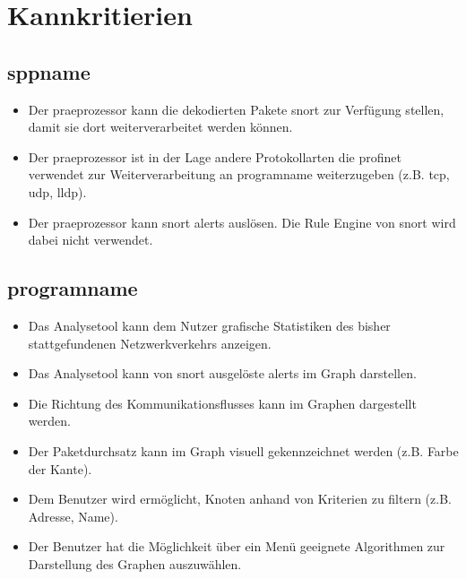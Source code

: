 \section{Kannkritierien}

\subsection{\gls{sppname}}

\begin{itemize}

\item Der \gls{praeprozessor} kann die dekodierten Pakete \gls{snort} zur Verfügung stellen, damit sie dort weiterverarbeitet werden können.

\item Der \gls{praeprozessor} ist in der Lage andere Protokollarten die \gls{profinet} verwendet zur Weiterverarbeitung an \gls{programname} weiterzugeben (z.B. \gls{tcp}, \gls{udp}, \gls{lldp}).

\item Der \gls{praeprozessor} kann \gls{snort} \glspl{alert} auslösen. Die Rule Engine von \gls{snort} wird dabei nicht verwendet.
\end{itemize}

\subsection{\gls{programname}}

\begin{itemize}
\item Das Analysetool kann dem Nutzer grafische Statistiken des bisher stattgefundenen Netzwerkverkehrs anzeigen.

\item Das Analysetool kann von \gls{snort} ausgelöste \glspl{alert} im Graph darstellen.

\item Die Richtung des Kommunikationsflusses kann im Graphen dargestellt werden.

\item Der Paketdurchsatz kann im Graph visuell gekennzeichnet werden (z.B. Farbe der Kante).

\item Dem Benutzer wird ermöglicht, Knoten anhand von Kriterien zu filtern (z.B. Adresse, Name).

\item Der Benutzer hat die Möglichkeit über ein Menü geeignete Algorithmen zur Darstellung des Graphen auszuwählen.
\end{itemize}

